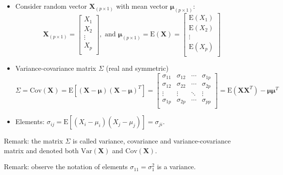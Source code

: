 \documentclass[ignorenonframetext,]{beamer}
\providecommand{\tightlist}{%
  \setlength{\itemsep}{0pt}\setlength{\parskip}{0pt}}
\begin{document}
\begin{frame}

\begin{itemize}
\tightlist
\item
  Consider random vector \(\mathbf{X}_{(p\times 1)}\) with mean vector
  \(\mathbf{\mu}_{(p\times 1)}\):
  \[\mathbf{X}_{(p\times 1)} =\left[ \begin{array}{c} X_1\\ X_2\\ \vdots\\ X_p\\ \end{array} \right], \text{ and }\mathbf{\mu}_{(p\times 1)} =\text{E}(\mathbf{X})=\left[ \begin{array}{c} \text{E}(X_1)\\ \text{E}(X_2)\\ \vdots\\ \text{E}(X_p)\\ \end{array}\right]\]
\item
  Variance-covariance matrix \(\Sigma\) (real and symmetric)
  \[\Sigma=\text{Cov}(\mathbf{X})=\text{E}[(\mathbf{X}-\mathbf{\mu})(\mathbf{X}-\mathbf{\mu})^T]= \left[ \begin{array}{cccc} \sigma_{11} & \sigma_{12} & \cdots & \sigma_{1p}\\ \sigma_{12} & \sigma_{22} & \cdots & \sigma_{2p}\\ \vdots & \vdots & \ddots & \vdots\\ \sigma_{1p} & \sigma_{2p} & \cdots & \sigma_{pp}\\ \end{array}  \right]= \text{E}(\mathbf{X}\mathbf{X}^T)-\mathbf{\mu}\mathbf{\mu}^T\]
\item
  Elements:
  \(\sigma_{ij}=\text{E}[(X_i-\mu_i)(X_j-\mu_j)]=\sigma_{ji}\).
\end{itemize}

Remark: the matrix \(\Sigma\) is called variance, covariance and
variance-covariance matrix and denoted both \(\text{Var}(\mathbf{X})\)
and \(\text{Cov}(\mathbf{X})\).

Remark: observe the notation of elements \(\sigma_{11}=\sigma_1^2\) is a
variance.

\end{frame}
\end{document}
